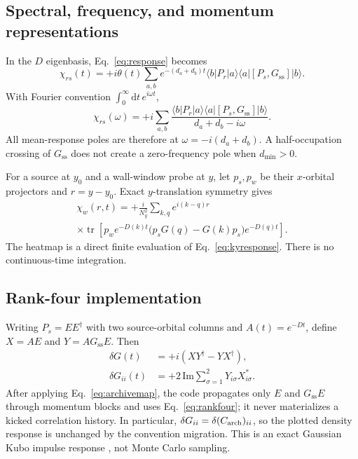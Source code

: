 \documentclass[aps,prb,twocolumn,nofootinbib,superscriptaddress,floatfix]{revtex4-2}
\newcommand{\tr}{\operatorname{tr}}
\newcommand{\Gss}{G_{\mathrm{ss}}}
\newcommand{\dd}{\mathrm{d}}
\begin{document}
\subsection{Spectral, frequency, and momentum representations}

In the $D$ eigenbasis, Eq.~\eqref{eq:response} becomes
\begin{equation}
 \chi_{rs}(t)=+i\theta(t)\sum_{a,b}e^{-(d_a+d_b)t}
 \langle b|P_r|a\rangle\langle a|[P_s,\Gss]|b\rangle.
 \label{eq:spectralresponse}
\end{equation}
With Fourier convention $\int_0^\infty\dd t\,e^{i\omega t}$,
\begin{equation}
 \chi_{rs}(\omega)=+i\sum_{a,b}
 \frac{\langle b|P_r|a\rangle\langle a|[P_s,\Gss]|b\rangle}
 {d_a+d_b-i\omega}.
 \label{eq:frequencyresponse}
\end{equation}
All mean-response poles are therefore at $\omega=-i(d_a+d_b)$. A
half-occupation crossing of $\Gss$ does not create a zero-frequency pole when
$d_{\min}>0$.

For a source at $y_0$ and a wall-window probe at $y$, let $p_s,p_w$ be their
$x$-orbital projectors and $r=y-y_0$. Exact $y$-translation symmetry gives
\begin{multline}
 \chi_w(r,t)=+\frac{i}{N_y^2}\sum_{k,q}e^{i(k-q)r}\\
 \times\tr\!\left[p_w e^{-D(k)t}
 \bigl(p_sG(q)-G(k)p_s\bigr)e^{-D(q)t}\right].
 \label{eq:kyresponse}
\end{multline}
The heatmap is a direct finite evaluation of Eq.~\eqref{eq:kyresponse}.
There is no continuous-time integration.

\subsection{Rank-four implementation}

Writing $P_s=EE^\dagger$ with two source-orbital columns and
$A(t)=e^{-Dt}$, define $X=AE$ and $Y=A\Gss E$. Then
\begin{align}
 \delta G(t)&=+i(XY^\dagger-YX^\dagger),\nonumber\\
 \delta G_{ii}(t)&=+2\,\mathrm{Im}
 \sum_{\sigma=1}^2Y_{i\sigma}X^*_{i\sigma}.
 \label{eq:rankfour}
\end{align}
After applying Eq.~\eqref{eq:archivemap}, the code propagates only $E$ and
$\Gss E$ through momentum blocks and uses Eq.~\eqref{eq:rankfour}; it never
materializes a kicked correlation history. In particular,
$\delta G_{ii}=\delta(C_{\rm arch})_{ii}$, so the plotted density response is
unchanged by the convention migration.
This is an exact Gaussian Kubo impulse response
\cite{Albert2016,Venuti2016}, not Monte Carlo sampling.
\end{document}
